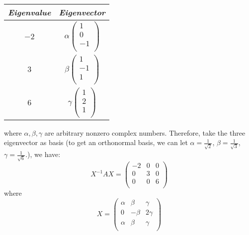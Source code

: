 \documentclass{article}
\begin{document}
\begin{table}[H]
    \centering
    \begin{tabular}{c c}
        \textit{Eigenvalue} & \textit{Eigenvector} \\
        \hline
        $-2$ & $\alpha \left( \begin{array}{c}
                     1 \\
                     0 \\
                     -1 \\
                \end{array} \right)$ \\
        $3$ & $\beta \left( \begin{array}{c}
                     1 \\
                     -1 \\
                     1 \\
                \end{array} \right)$ \\
        $6$ & $\gamma \left( \begin{array}{c}
                     1 \\
                     2 \\
                     1 \\
                \end{array} \right)$
    \end{tabular}
\end{table}
where $\alpha,\beta,\gamma$ are arbitrary nonzero complex numbers.
Therefore, take the three eigenvector as basis (to get an orthonormal
    basis, we can let $\alpha=\frac{1}{\sqrt{2}}$,
    $\beta=\frac{1}{\sqrt{3}}$, $\gamma=\frac{1}{\sqrt{6}}$.), we
have:
$$
X^{-1}AX = \left(
\begin{array}{ccc}
 -2 & 0 & 0 \\
 0 & 3 & 0 \\
 0 & 0 & 6 \\
\end{array}
\right) 
$$
where
$$
X=\left( \begin{array}{ccc}
 \alpha & \beta & \gamma \\
 0 & -\beta & 2\gamma \\
 \alpha & \beta & \gamma \\
\end{array} \right)
$$
\end{document}
